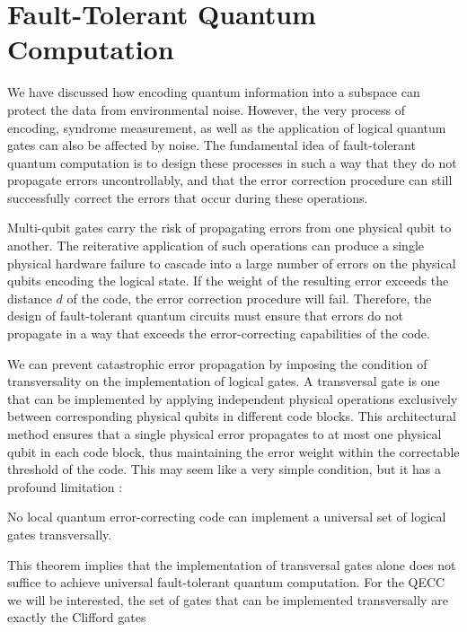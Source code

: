 \documentclass[12pt, twoside, openany]{book}
\begin{document}
\section{Fault-Tolerant Quantum Computation}

We have discussed how encoding quantum information into a subspace can protect the data from environmental noise. However, the very process of encoding, syndrome measurement, as well as the application of logical quantum gates can also be affected by noise. The fundamental idea of fault-tolerant quantum computation is to design these processes in such a way that they do not propagate errors uncontrollably, and that the error correction procedure can still successfully correct the errors that occur during these operations. 

Multi-qubit gates carry the risk of propagating errors from one physical qubit to another. The reiterative application of such operations can produce a single physical hardware failure to cascade into a large number of errors on the physical qubits encoding the logical state. If the weight of the resulting error exceeds the distance $d$ of the code, the error correction procedure will fail. Therefore, the design of fault-tolerant quantum circuits must ensure that errors do not propagate in a way that exceeds the error-correcting capabilities of the code. 

We can prevent catastrophic error propagation by imposing the condition of transversality on the implementation of logical gates. A transversal gate is one that can be implemented by applying independent physical operations exclusively between corresponding physical qubits in different code blocks. This architectural method ensures that a single physical error propagates to at most one physical qubit in each code block, thus maintaining the error weight within the correctable threshold of the code. This may seem like a very simple condition, but it has a profound limitation \cite{Eastin2009}:

\begin{theorem}
No local quantum error-correcting code can implement a universal set of logical gates transversally.
\end{theorem}

This theorem implies that the implementation of transversal gates alone does not suffice to achieve universal fault-tolerant quantum computation. For the QECC we will be interested, the set of gates that can be implemented transversally are exactly the Clifford gates \cite{Bravyi_2013}
\end{document}
